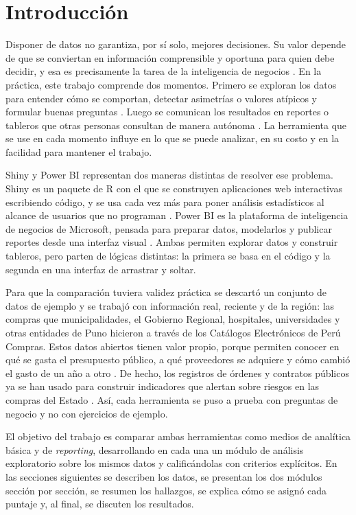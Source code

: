 \documentclass[12pt,a4paper]{article}
\begin{document}
\section{Introducción}
Disponer de datos no garantiza, por sí solo, mejores decisiones. Su valor depende de que se conviertan en
información comprensible y oportuna para quien debe decidir, y esa es precisamente la tarea de la inteligencia de negocios
\citep{watson2007,chen2012}. En la práctica, este trabajo comprende dos momentos. Primero se exploran los datos para
entender cómo se comportan, detectar asimetrías o valores atípicos y formular buenas preguntas
\citep{behrens1997}. Luego se comunican los resultados en reportes o tableros que otras personas consultan
de manera autónoma \citep{yigitbasioglu2012,sarikaya2019}. La herramienta que se use en cada momento influye en
lo que se puede analizar, en su costo y en la facilidad para mantener el trabajo.

Shiny y Power BI representan dos maneras distintas de resolver ese problema. Shiny es un paquete de R con
el que se construyen aplicaciones web interactivas escribiendo código, y se usa cada vez más para poner
análisis estadísticos al alcance de usuarios que no programan \citep{jia2022}. Power BI es la plataforma de
inteligencia de negocios de Microsoft, pensada para preparar datos, modelarlos y publicar reportes desde una
interfaz visual \citep{becker2019}. Ambas permiten explorar datos y construir tableros, pero parten de
lógicas distintas: la primera se basa en el código y la segunda en una interfaz de arrastrar y soltar.

Para que la comparación tuviera validez práctica se descartó un conjunto de datos de ejemplo y se trabajó con
información real, reciente y de la región: las compras que municipalidades, el Gobierno Regional,
hospitales, universidades y otras entidades de Puno hicieron a través de los Catálogos Electrónicos de
Perú Compras. Estos datos abiertos tienen valor propio, porque permiten conocer en qué se gasta el
presupuesto público, a qué proveedores se adquiere y cómo cambió el gasto de un año a otro \citep{janssen2012}. De hecho, los registros de órdenes y
contratos públicos ya se han usado para construir indicadores que alertan sobre riesgos en las compras del
Estado \citep{fazekas2020}.
Así, cada herramienta se puso a prueba con preguntas de negocio y no con ejercicios de ejemplo.

El objetivo del trabajo es comparar ambas herramientas como medios de analítica básica y de
\emph{reporting}, desarrollando en cada una un módulo de análisis exploratorio sobre los mismos datos y
calificándolas con criterios explícitos. En las secciones siguientes se describen los datos, se presentan
los dos módulos sección por sección, se resumen los hallazgos, se explica cómo se asignó cada puntaje y,
al final, se discuten los resultados.
\end{document}
